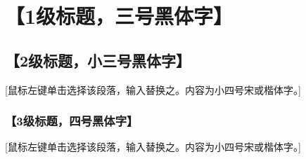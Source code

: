 \chapter[\color{blue}1级标题]{【1级标题，三号黑体字】}
\section[\color{blue}2级标题]{【2级标题，小三号黑体字】 }
 [鼠标左键单击选择该段落，输入替换之。内容为小四号宋或楷体字。]
\subsection[\color{blue}3级标题]{【3级标题，四号黑体字】 }
[鼠标左键单击选择该段落，输入替换之。内容为小四号宋或楷体字。]